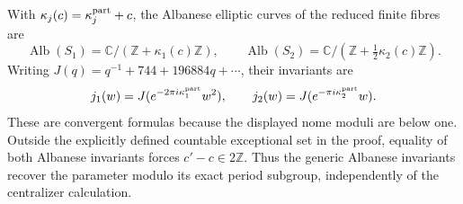 \begin{proposition}\label{fam:src:A.4.1}\label{fam:st:A.4.1}
With $\kappa_j(c)=\kappa_j^{\rm part}+c$, the Albanese elliptic curves of the reduced finite fibres are
\[
 \operatorname{Alb}(S_1)=\mathbb C/(\mathbb Z+\kappa_1(c)\mathbb Z),\qquad
 \operatorname{Alb}(S_2)=\mathbb C/(\mathbb Z+\tfrac12\kappa_2(c)\mathbb Z).
\]
Writing $J(q)=q^{-1}+744+196884q+\cdots$, their invariants are
\[
 j_1(w)=J(e^{-2\pi i\kappa_1^{\rm part}}w^2),\qquad
 j_2(w)=J(e^{-\pi i\kappa_2^{\rm part}}w).
\]
These are convergent formulas because the displayed nome moduli are below one. Outside the explicitly defined countable exceptional set in the proof, equality of both Albanese invariants forces $c'-c\in2\mathbb Z$. Thus the generic Albanese invariants recover the parameter modulo its exact period subgroup, independently of the centralizer calculation.
\end{proposition}

